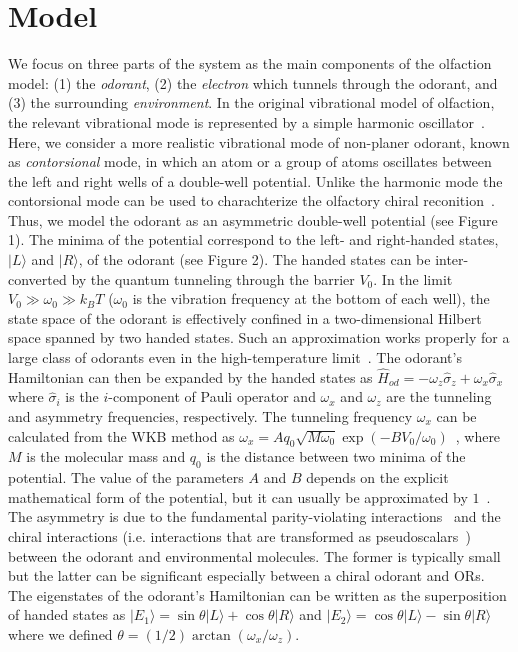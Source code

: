 \documentclass[aps,prl,tightenlines,onecolumn,superscriptaddress]{revtex4}
\begin{document}
\section{Model}
We focus on three parts of the system as the main components of the olfaction model: (1) the {\it odorant}, (2) the {\it electron} which tunnels through the odorant, and (3) the surrounding {\it environment}. In the original vibrational model of olfaction, the relevant vibrational mode is represented by a simple harmonic oscillator~\cite{Bro}. Here, we consider a more realistic vibrational mode of non-planer odorant, known as {\it contorsional} mode, in which an atom or a group of atoms oscillates between the left and right wells of a double-well potential. Unlike the harmonic mode the contorsional mode can be used to charachterize the olfactory chiral reconition~\cite{Tir}. Thus, we model the odorant as an asymmetric double-well potential (see Figure 1). The minima of the potential correspond to the left- and right-handed states, $|L\rangle$ and $|R\rangle$, of the odorant (see Figure 2). The handed states can be inter-converted by the quantum tunneling through the barrier $V_{0}$. In the limit $V_{0}\gg \omega_{0}\gg k_{B}T$ ($\omega_{0}$ is the vibration frequency at the bottom of each well), the state space of the odorant is effectively confined in a two-dimensional Hilbert space spanned by two handed states. Such an approximation works properly for a large class of odorants even in the high-temperature limit~\cite{Tow,Her}. The odorant's Hamiltonian can then be expanded by the handed states as $\hat{H}_{od}=-\omega_{z}\hat{\sigma}_{z}+\omega_{x}\hat{\sigma}_{x}$ where $\hat{\sigma}_{i}$ is the $i$-component of Pauli operator and $\omega_{x}$ and $\omega_{z}$ are the tunneling and asymmetry frequencies, respectively. The tunneling frequency $\omega_{x}$ can be calculated from the WKB method as $\omega_{x}=Aq_{0}\sqrt{M\omega_{0}}\exp(-BV_{0}/\omega_{0})$~\cite{Leg}, where $M$ is the molecular mass and $q_{0}$ is the distance between two minima of the potential. The value of the parameters $A$ and $B$ depends on the explicit mathematical form of the potential, but it can usually be approximated by $1$~\cite{Leg,Wei}. The asymmetry is due to the fundamental parity-violating interactions~\cite{Qua,Lee} and the chiral interactions (i.e. interactions that are transformed as pseudoscalars~\cite{Bar}) between the odorant and environmental molecules. The former is typically small but the latter can be significant especially between a chiral odorant and ORs. The eigenstates of the odorant's Hamiltonian can be written as the superposition of handed states as $|E_{1}\rangle=\sin\theta|L\rangle+\cos\theta|R\rangle$ and $|E_{2}\rangle=\cos\theta|L\rangle-\sin\theta|R\rangle$ where we defined $\theta=(1/2)\arctan(\omega_{x}/\omega_{z})$.\\
\end{document}
